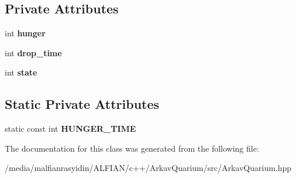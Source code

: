 \subsection*{Private Attributes}
\begin{DoxyCompactItemize}
\item 
\mbox{\label{class_guppy_abb54e32e8baf5e198479b6544dfd990d}} 
int {\bfseries hunger}
\item 
\mbox{\label{class_guppy_a2e03962132221a47e80144e10509de51}} 
int {\bfseries drop\+\_\+time}
\item 
\mbox{\label{class_guppy_a40b17829da0d5168e16ea35176e13dc6}} 
int {\bfseries state}
\end{DoxyCompactItemize}
\subsection*{Static Private Attributes}
\begin{DoxyCompactItemize}
\item 
\mbox{\label{class_guppy_adfe80e467d5f4a22f76fca86532e6cfd}} 
static const int {\bfseries H\+U\+N\+G\+E\+R\+\_\+\+T\+I\+ME}
\end{DoxyCompactItemize}


The documentation for this class was generated from the following file\+:\begin{DoxyCompactItemize}
\item 
/media/malfianrasyidin/\+A\+L\+F\+I\+A\+N/c++/\+Arkav\+Quarium/src/Arkav\+Quarium.\+hpp\end{DoxyCompactItemize}
